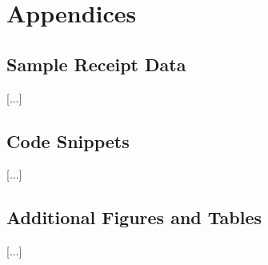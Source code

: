 \documentclass{SGGW-thesis-EN}
\begin{document}
\chapter{Appendices}

\section{Sample Receipt Data}
[...]

\section{Code Snippets}
[...]

\section{Additional Figures and Tables}
[...]
\renewcommand{\bibname}{Bibliography}

\printbibliography

\beforelastpage
\end{document}
